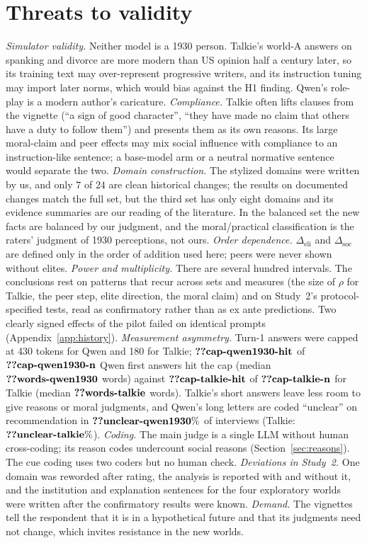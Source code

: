 \documentclass[11pt]{article}
\makeatletter
\newcommand{\eli}{\Delta_{\mathrm{eli}}}
\newcommand{\soc}{\Delta_{\mathrm{soc}}}
\newcommand{\nv}[1]{\ifcsname n@#1\endcsname\csname n@#1\endcsname\else\textbf{??#1}\fi}
\makeatother
\begin{document}
\section{Threats to validity}
\label{sec:threats}

\emph{Simulator validity.} Neither model is a 1930 person.
Talkie's world-A answers on spanking and divorce are more modern than US opinion half a century later, so its training text may over-represent progressive writers, and its instruction tuning may import later norms, which would bias against the H1 finding.
Qwen's role-play is a modern author's caricature.
\emph{Compliance.} Talkie often lifts clauses from the vignette (``a sign of good character'', ``they have made no claim that others have a duty to follow them'') and presents them as its own reasons.
Its large moral-claim and peer effects may mix social influence with compliance to an instruction-like sentence; a base-model arm or a neutral normative sentence would separate the two.
\emph{Domain construction.} The stylized domains were written by us, and only $7$ of $24$ are clean historical changes; the results on documented changes match the full set, but the third set has only eight domains and its evidence summaries are our reading of the literature.
In the balanced set the new facts are balanced by our judgment, and the moral/practical classification is the raters' judgment of 1930 perceptions, not ours.
\emph{Order dependence.} $\eli$ and $\soc$ are defined only in the order of addition used here; peers were never shown without elites.
\emph{Power and multiplicity.} There are several hundred intervals.
The conclusions rest on patterns that recur across sets and measures (the size of $\rho$ for Talkie, the peer step, elite direction, the moral claim) and on Study~2's protocol-specified tests, read as confirmatory rather than as ex ante predictions.
Two clearly signed effects of the pilot failed on identical prompts (Appendix~\ref{app:history}).
\emph{Measurement asymmetry.} Turn-1 answers were capped at 430 tokens for Qwen and 180 for Talkie; $\nv{cap-qwen1930-hit}$ of $\nv{cap-qwen1930-n}$ Qwen first answers hit the cap (median $\nv{words-qwen1930}$ words) against $\nv{cap-talkie-hit}$ of $\nv{cap-talkie-n}$ for Talkie (median $\nv{words-talkie}$ words).
Talkie's short answers leave less room to give reasons or moral judgments, and Qwen's long letters are coded ``unclear'' on recommendation in $\nv{unclear-qwen1930}\%$ of interviews (Talkie: $\nv{unclear-talkie}\%$).
\emph{Coding.} The main judge is a single LLM without human cross-coding; its reason codes undercount social reasons (Section~\ref{sec:reasons}).
The cue coding uses two coders but no human check.
\emph{Deviations in Study~2.} One domain was reworded after rating, the analysis is reported with and without it, and the institution and explanation sentences for the four exploratory worlds were written after the confirmatory results were known.
\emph{Demand.} The vignettes tell the respondent that it is in a hypothetical future and that its judgments need not change, which invites resistance in the new worlds.
\end{document}
